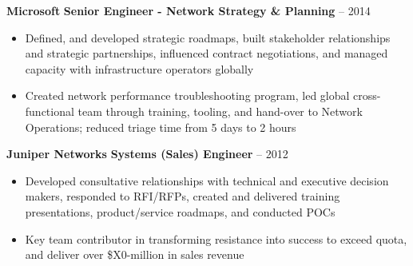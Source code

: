 \documentclass[11pt]{article}
\newcommand{\job}[3]{
    \begingroup
        \textbf{\small#1} \hfill \textbf{\small#2} \--- \color{black!70}\small{#3}
    \endgroup
}
\newcommand{\spacevv}{
    \vspace{2mm}
}
\begin{document}
\begin{paracol}{2}
{    \job{Microsoft}{Senior Engineer \-- Network Strategy \& Planning}{2014\--2017}
    \begin{itemize}
        \item Defined, and developed strategic roadmaps, built stakeholder relationships and strategic
            partnerships, influenced contract negotiations, and managed capacity with infrastructure operators globally
        \item Created network performance troubleshooting program, led global cross-functional team through training,
            tooling, and hand-over to Network Operations; reduced triage time from 5 days to 2 hours
    \end{itemize}
    \spacevv{}

    \job{Juniper Networks}{Systems (Sales) Engineer}{2012}
    \begin{itemize}
        \item Developed consultative relationships with technical and executive decision makers, responded to RFI/RFPs,
            created and delivered training presentations, product/service roadmaps, and conducted POCs
        \item Key team contributor in transforming resistance into success to exceed quota, and deliver over
            \$X0-million in sales revenue
    \end{itemize}
    \spacevv{}

}
\end{paracol}
\end{document}

